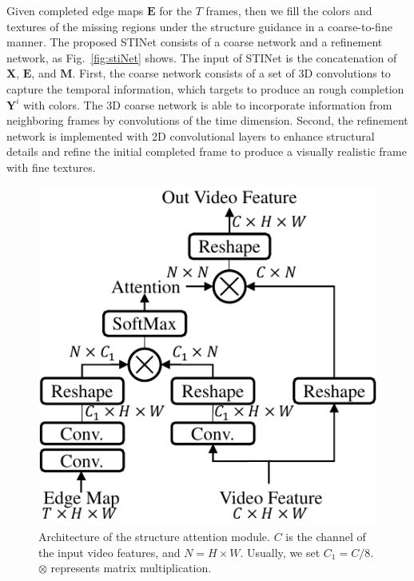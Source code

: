 Given completed edge maps $\boldsymbol{E}$ for the 
$T$ frames, then we fill the colors and textures of the missing regions under the structure guidance in a coarse-to-fine manner. 
%
The proposed STINet consists of a coarse network and a refinement network, as Fig.~\ref{fig:stiNet} shows.
%
The input of STINet is the concatenation of $\boldsymbol{X}$, $\boldsymbol{E}$, and $\boldsymbol{M}$.
First, the coarse network consists of a set of 3D convolutions to capture the temporal information, which targets to produce an rough completion $\boldsymbol{Y}^i$ with colors.
% 
The 3D coarse network is able to incorporate information from neighboring frames by convolutions of the time dimension.
Second, the refinement network is implemented with 2D convolutional layers to enhance structural details and refine the initial completed frame to produce a visually realistic frame with fine textures.

\begin{figure}[t]
	\centering
	\includegraphics[width=0.7\columnwidth]{SEM} %
	\caption{Architecture of the structure attention module. $C$ is the channel of the input video features, and $N=H\times W$. Usually, we set $C_1=C/8$. $\otimes$ represents matrix multiplication.}
	\label{SEM}
\end{figure}

